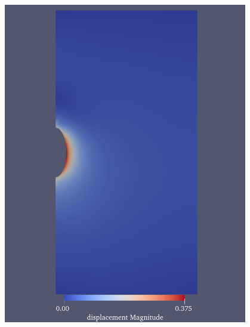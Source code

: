 \begin{figure}[ht!]
{\begin{minipage}{6.2cm}
            \includegraphics[width=0.95\textwidth]{img/chap5/位移/工况三位移云图.pdf}
        \end{minipage}
    }
\end{figure}
